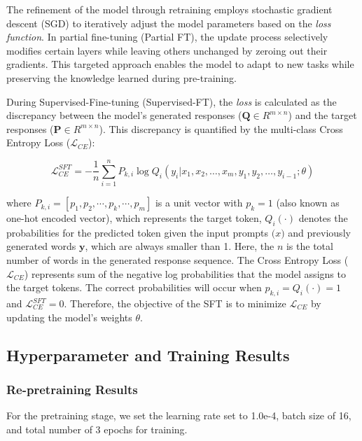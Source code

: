 The refinement of the model through retraining employs stochastic gradient descent (SGD) to iteratively adjust the model parameters based on the \textit{loss function}. In partial fine-tuning (Partial FT), the update process selectively modifies certain layers while leaving others unchanged by zeroing out their gradients. This targeted approach enables the model to adapt to new tasks while preserving the knowledge learned during pre-training.

During Supervised-Fine-tuning (Supervised-FT), the \textit{loss} is calculated as the discrepancy between the model's generated responses ($\bm{Q} \in R^{m\times n}$) and the target responses ($\bm{P} \in R^{m \times n}$). This discrepancy is quantified by the multi-class Cross Entropy Loss ($\mathcal{L}_{CE}$):

\begin{equation*}
  \mathcal{L}_{CE}^{SFT} = -\frac{1}{n}\sum_{i=1}^{n} P_{k,i}\log  Q_i(y_i|x_1, x_2, \dots,x_m, y_1, y_2, \dots, y_{i-1}; \theta)
\end{equation*}

where $P_{k,i} = [p_1, p_2, \cdots, p_k, \cdots,p_m]$ is a unit vector with $p_k = 1$ (also known as one-hot encoded vector), which represents the target token, $Q_i(\cdot)$ denotes the probabilities for the predicted token given the input prompts $\bm(x)$ and previously generated words $\bm{y}$, which are always smaller than 1. Here, the $n$ is the total number of words in the generated response sequence. The Cross Entropy Loss ($\mathcal{L}_{CE}$) represents sum of the negative log probabilities that the model assigns to the target tokens. The correct probabilities will occur when $p_{k,i}=Q_i(\cdot) = 1$ and $\mathcal{L}_{CE}^{SFT}=0$. Therefore, the objective of the SFT is to minimize $\mathcal{L}_{CE}$ by updating the model's weights $\theta$.  



\subsection{Hyperparameter and Training Results}

\subsubsection*{Re-pretraining Results}
For the pretraining stage, we set the learning rate set to 1.0e-4, batch size of 16, and total number of 3 epochs for training. 


